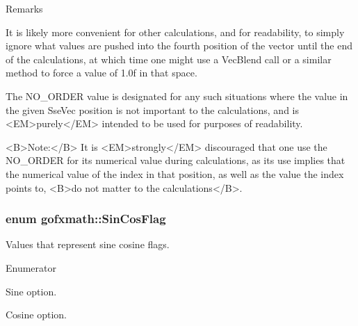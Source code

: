 \begin{Desc}
\begin{description}
\begin{DoxyRemark}{Remarks}
\begin{DoxyVerb}
           It is likely more convenient for other calculations, and for readability, to simply ignore what
           values are pushed into the fourth position of the vector until the end of the calculations, at
           which time one might use a VecBlend call or a similar method to force a value of 1.0f in that
           space.

           The NO_ORDER value is designated for any such situations where the value in the given SseVec position
           is not important to the calculations, and is <EM>purely</EM> intended to be used for purposes of
           readability.

           <B>Note:</B> It is <EM>strongly</EM> discouraged that one use the NO_ORDER for its numerical value during calculations,
           as its use implies that the numerical value of the index in that position, as well as the value the index points
           to, <B>do not matter to the calculations</B>.\end{DoxyVerb}
 
\end{DoxyRemark}
\end{description}
\end{Desc}
\hypertarget{namespacegofxmath_a67a56526fdca522579dadeb59e2cedaa}{}
\subsubsection[{Sin\+Cos\+Flag}]{\setlength{\rightskip}{0pt plus 5cm}enum {\bf gofxmath\+::\+Sin\+Cos\+Flag}}\label{namespacegofxmath_a67a56526fdca522579dadeb59e2cedaa}


Values that represent sine cosine flags. 

\begin{Desc}
\item[Enumerator]\par
\begin{description}
\item[{\em 
\hypertarget{namespacegofxmath_a67a56526fdca522579dadeb59e2cedaaa4c66cfae8f94035eaede20844570a27f}{}S\+I\+N\label{namespacegofxmath_a67a56526fdca522579dadeb59e2cedaaa4c66cfae8f94035eaede20844570a27f}
}]Sine option. \item[{\em 
\hypertarget{namespacegofxmath_a67a56526fdca522579dadeb59e2cedaaac06d99c0a383a5ea3aca59fa2f00f519}{}C\+O\+S\label{namespacegofxmath_a67a56526fdca522579dadeb59e2cedaaac06d99c0a383a5ea3aca59fa2f00f519}
}]Cosine option. \end{description}
\end{Desc}
\hypertarget{namespacegofxmath_a6c05153fd2e2d4119d91daca01a06741}{}
